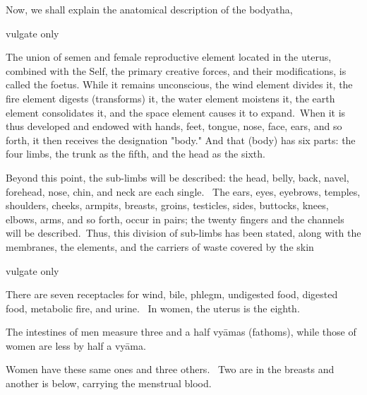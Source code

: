 \begin{translation}
  
  \begin{tt}
      \raggedright
      \bigskip
      
\item[1]
Now, we shall explain the anatomical description of the bodyatha, 

\item[2]    vulgate only

\item[3]

The union of semen and female reproductive element located in the uterus, combined with the Self, the primary creative forces, and their modifications, is called the foetus. While it remains unconscious, the wind element divides it, the fire element digests (transforms) it, the water element moistens it, the earth element consolidates it, and the space element causes it to expand. When it is thus developed and endowed with hands, feet, tongue, nose, face, ears, and so forth, it then receives the designation "body." And that (body) has six parts: the four limbs, the trunk as the fifth, and the head as the sixth.

\item[4]
Beyond this point, the sub-limbs will be described: the head, belly, back, navel, forehead, nose, chin, and neck are each single.  The ears, eyes, eyebrows, temples, shoulders, cheeks, armpits, breasts, groins, testicles, sides, buttocks, knees, elbows, arms, and so forth, occur in pairs; the twenty fingers and the channels will be described. Thus, this division of sub-limbs has been stated, along with the membranes, the elements, and the carriers of waste  covered by the skin

\item[5, 6 and 7]  vulgate only

\item[8]

There are seven receptacles for wind, bile, phlegm, undigested food, digested food, metabolic fire, and urine.  In women, the uterus is the eighth. 

\item[9]

The intestines of men measure three and a half vyāmas (fathoms), while those of women are less by half a vyāma. 

\item[10]

Women have these same ones and three others. 
Two are in the breasts and another is below, carrying the menstrual blood. 


\end{tt}
\end{translation}
